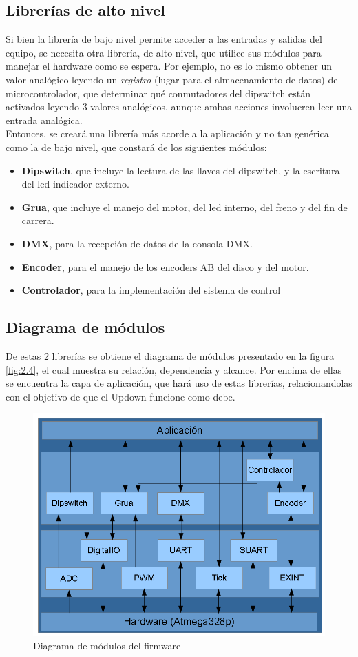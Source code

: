 \subsection{Librerías de alto nivel}
Si bien la librería de bajo nivel permite acceder a las entradas y salidas del equipo, se necesita otra librería, de alto nivel, que utilice sus módulos para manejar el hardware como se espera. Por ejemplo, no es lo mismo obtener un valor analógico leyendo un \textit{registro} (lugar para el almacenamiento de datos) del microcontrolador, que determinar qué conmutadores del dipswitch están activados leyendo 3 valores analógicos, aunque ambas acciones involucren leer una entrada analógica.\\
Entonces, se creará una librería más acorde a la aplicación y no tan genérica como la de bajo nivel, que constará de los siguientes módulos:
\begin{itemize}
	\item \textbf{Dipswitch}, que incluye la lectura de las llaves del dipswitch, y la escritura del led indicador externo.
	\item \textbf{Grua}, que incluye el manejo del motor, del led interno, del freno y del fin de carrera.
	\item \textbf{DMX}, para la recepción de datos de la consola DMX.
	\item \textbf{Encoder}, para el manejo de los encoders AB del disco y del motor.
	\item \textbf{Controlador}, para la implementación del sistema de control
\end{itemize}

\subsection{Diagrama de módulos}
De estas 2 librerías se obtiene el diagrama de módulos presentado en la figura \ref{fig:2.4}, el cual muestra su relación, dependencia y alcance. Por encima de ellas se encuentra la capa de aplicación, que hará uso de estas librerías, relacionandolas con el objetivo de que el Updown funcione como debe.

\begin{figure}[!ht]
	\centering
	\includegraphics[width=14cm,scale=1]{resources/2_4-diagramaDeModulos.png}
	\caption{Diagrama de módulos del firmware}
	\label{fig:\thefigure}
\end{figure}
